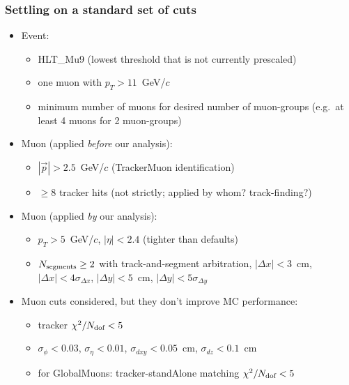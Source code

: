 \documentclass[compress]{beamer}
\newcommand{\s}[1]{{\mbox{\scriptsize #1}}}
\begin{document}
\begin{frame}
\frametitle{Settling on a standard set of cuts}

\begin{itemize}
\item Event:
\begin{itemize}
\item HLT\_Mu9 (lowest threshold that is not currently prescaled)
\item one muon with $p_T > 11$~GeV/$c$
\item minimum number of muons for desired number of muon-groups
  (e.g.\ at least 4 muons for 2 muon-groups)
\end{itemize}

\item Muon (applied {\it before} our analysis):
\begin{itemize}
\item $|\vec{p}| > 2.5$~GeV/$c$ (TrackerMuon identification)
\item $\ge 8$ tracker hits (not strictly; applied by whom? track-finding?)
\end{itemize}

\item Muon (applied {\it by} our analysis):
\begin{itemize}
\item $p_T > 5$~GeV/$c$, $|\eta| < 2.4$ (tighter than defaults)
\item $N_\s{segments} \ge 2$ with track-and-segment arbitration, $|\Delta x| < 3$~cm, $|\Delta x| < 4 \sigma_{\Delta x}$, $|\Delta y| < 5$~cm, $|\Delta y| < 5 \sigma_{\Delta y}$
\end{itemize}

\item Muon cuts considered, but they don't improve MC performance:
\begin{itemize}
\item tracker $\chi^2/N_\s{dof} < 5$
\item $\sigma_\phi < 0.03$, $\sigma_\eta < 0.01$, $\sigma_{dxy} < 0.05$~cm, $\sigma_{dz} < 0.1$~cm
\item for GlobalMuons: tracker-standAlone matching $\chi^2/N_\s{dof} < 5$
\end{itemize}
\end{itemize}
\end{frame}
\end{document}
